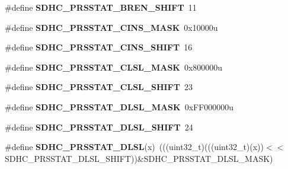 \begin{DoxyCompactItemize}
\item 
\#define {\bfseries S\+D\+H\+C\+\_\+\+P\+R\+S\+S\+T\+A\+T\+\_\+\+B\+R\+E\+N\+\_\+\+S\+H\+I\+FT}~11\hypertarget{group__SDHC__Register__Masks_ga755afbadcc686b9a04f531081c5fb811}{}\label{group__SDHC__Register__Masks_ga755afbadcc686b9a04f531081c5fb811}

\item 
\#define {\bfseries S\+D\+H\+C\+\_\+\+P\+R\+S\+S\+T\+A\+T\+\_\+\+C\+I\+N\+S\+\_\+\+M\+A\+SK}~0x10000u\hypertarget{group__SDHC__Register__Masks_ga48dc8b20e5092e223a378a1cba4803d1}{}\label{group__SDHC__Register__Masks_ga48dc8b20e5092e223a378a1cba4803d1}

\item 
\#define {\bfseries S\+D\+H\+C\+\_\+\+P\+R\+S\+S\+T\+A\+T\+\_\+\+C\+I\+N\+S\+\_\+\+S\+H\+I\+FT}~16\hypertarget{group__SDHC__Register__Masks_ga3aaccd62a11f1cd2f842cd8d5f50ba79}{}\label{group__SDHC__Register__Masks_ga3aaccd62a11f1cd2f842cd8d5f50ba79}

\item 
\#define {\bfseries S\+D\+H\+C\+\_\+\+P\+R\+S\+S\+T\+A\+T\+\_\+\+C\+L\+S\+L\+\_\+\+M\+A\+SK}~0x800000u\hypertarget{group__SDHC__Register__Masks_gab76b324ebb0b2d882ac0f8a1f563647d}{}\label{group__SDHC__Register__Masks_gab76b324ebb0b2d882ac0f8a1f563647d}

\item 
\#define {\bfseries S\+D\+H\+C\+\_\+\+P\+R\+S\+S\+T\+A\+T\+\_\+\+C\+L\+S\+L\+\_\+\+S\+H\+I\+FT}~23\hypertarget{group__SDHC__Register__Masks_ga321c503ac2679cd51a2a30219a33d951}{}\label{group__SDHC__Register__Masks_ga321c503ac2679cd51a2a30219a33d951}

\item 
\#define {\bfseries S\+D\+H\+C\+\_\+\+P\+R\+S\+S\+T\+A\+T\+\_\+\+D\+L\+S\+L\+\_\+\+M\+A\+SK}~0x\+F\+F000000u\hypertarget{group__SDHC__Register__Masks_gacc5e74fd893e00bf8d48d3ad7165de0a}{}\label{group__SDHC__Register__Masks_gacc5e74fd893e00bf8d48d3ad7165de0a}

\item 
\#define {\bfseries S\+D\+H\+C\+\_\+\+P\+R\+S\+S\+T\+A\+T\+\_\+\+D\+L\+S\+L\+\_\+\+S\+H\+I\+FT}~24\hypertarget{group__SDHC__Register__Masks_ga6c5c346e4671cdebd3a2132924f059a1}{}\label{group__SDHC__Register__Masks_ga6c5c346e4671cdebd3a2132924f059a1}

\item 
\#define {\bfseries S\+D\+H\+C\+\_\+\+P\+R\+S\+S\+T\+A\+T\+\_\+\+D\+L\+SL}(x)~(((uint32\+\_\+t)(((uint32\+\_\+t)(x))$<$$<$S\+D\+H\+C\+\_\+\+P\+R\+S\+S\+T\+A\+T\+\_\+\+D\+L\+S\+L\+\_\+\+S\+H\+I\+FT))\&S\+D\+H\+C\+\_\+\+P\+R\+S\+S\+T\+A\+T\+\_\+\+D\+L\+S\+L\+\_\+\+M\+A\+SK)\hypertarget{group__SDHC__Register__Masks_ga8d155771c72f8082c8a3174c8c0aa279}{}\label{group__SDHC__Register__Masks_ga8d155771c72f8082c8a3174c8c0aa279}


\end{DoxyCompactItemize}
